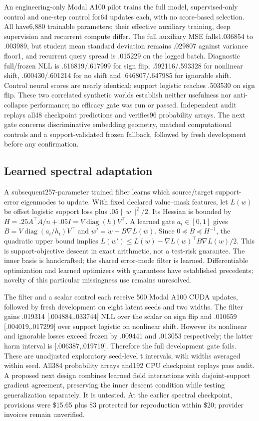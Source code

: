 \documentclass[10pt]{article}
\begin{document}
An engineering-only Modal A100 pilot trains the full model, supervised-only control and one-step control for64 updates each, with no score-based selection. All have6,880 trainable parameters; their effective auxiliary training, deep supervision and recurrent compute differ. The full auxiliary MSE falls1.036854 to .003989, but student mean standard deviation remains .029807 against variance floor1, and recurrent query spread is .015229 on the logged batch. Diagnostic full/frozen NLL is .616819/.617999 for sign flip, .592116/.593328 for nonlinear shift, .600430/.601214 for no shift and .646807/.647985 for ignorable shift. Control neural scores are nearly identical; support logistic reaches .503530 on sign flip. These two correlated synthetic worlds establish neither usefulness nor anti-collapse performance; no efficacy gate was run or passed. Independent audit replays all48 checkpoint predictions and verifies96 probability arrays. The next gate concerns discriminative embedding geometry, matched computational controls and a support-validated frozen fallback, followed by fresh development before any confirmation.


\subsection{Learned spectral adaptation}
A subsequent257-parameter trained filter learns which source/target support-error eigenmodes to update. With fixed declared value--mask features, let $L(w)$ be offset logistic support loss plus $.05\|w\|^2/2$. Its Hessian is bounded by $H=.25A^\top A/n+.05I=V\operatorname{diag}(h)V^\top$. A learned gate $a_i\in[0,1]$ gives $B=V\operatorname{diag}(a_i/h_i)V^\top$ and $w'=w-B\nabla L(w)$. Since $0\preceq B\preceq H^{-1}$, the quadratic upper bound implies $L(w')\le L(w)-\nabla L(w)^\top B\nabla L(w)/2$. This is support-objective descent in exact arithmetic, not a test-risk guarantee. The inner basis is handcrafted; the shared error-mode filter is learned. Differentiable optimization and learned optimizers with guarantees have established precedents\cite{metaoptnet,learnedopt,pacopt}; novelty of this particular missingness use remains unresolved.

The filter and a scalar control each receive 500 Modal A100 CUDA updates, followed by fresh development on eight latent seeds and two widths. The filter gains .019314 [.004884,.033744] NLL over the scalar on sign flip and .010659 [.004019,.017299] over support logistic on nonlinear shift. However its nonlinear and ignorable losses exceed frozen by .009441 and .013053 respectively; the latter harm interval is [.006387,.019719]. Therefore the full development gate fails. These are unadjusted exploratory seed-level t intervals, with widths averaged within seed. All384 probability arrays and192 CPU checkpoint replays pass audit. A proposed next design combines learned field interactions with disjoint-support gradient agreement, preserving the inner descent condition while testing generalization separately. It is untested. At the earlier spectral checkpoint, provisions were \$15.65 plus \$3 protected for reproduction within \$20; provider invoices remain unverified.
\end{document}
